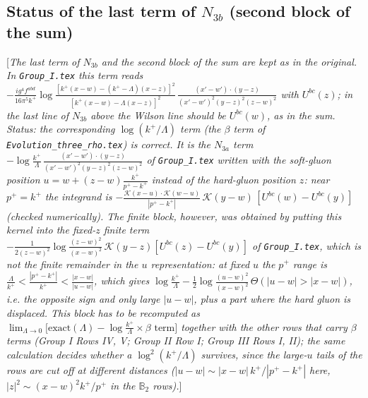 \documentclass[9pt]{article}
\def\mf#1{\mathbb{#1}}
\newcommand{\chg}[1]{{\color{red}#1}}
\newcommand{\rnote}[1]{{\color{teal}[\textit{#1}]}}
\numberwithin{equation}{section}
\begin{document}
\subsection*{\chg{Status of the last term of $N_{3b}$ (second block of the sum)}}
\rnote{The last term of $N_{3b}$ and the second block of the sum are kept as in the original. In \texttt{Group\_I.tex} this term reads $-\frac{ig^{4}f^{abd}}{16\pi^{5}k^{+}}\log\frac{[k^{+}(x-w)-(k^{+}-\Lambda)(x-z)]^{2}}{[k^{+}(x-w)-\Lambda(x-z)]^{2}}\,\frac{(x'-w')\cdot(y-z)}{(x'-w')^{2}(y-z)^{2}(z-w)^{2}}$ with $U^{bc}(z)$; in the last line of $N_{3b}$ above the Wilson line should be $U^{bc}(w)$, as in the sum. Status: the corresponding $\log(k^{+}/\Lambda)$ term (the $\beta$ term of \texttt{Evolution\_three\_rho.tex}) is correct. It is the $N_{3a}$ term $-\log\frac{k^{+}}{\Lambda}\,\frac{(x'-w')\cdot(y-z)}{(x'-w')^{2}(y-z)^{2}(z-w)^{2}}$ of \texttt{Group\_I.tex} written with the soft-gluon position $u=w+(z-w)\frac{k^{+}}{p^{+}-k^{+}}$ instead of the hard-gluon position $z$: near $p^{+}=k^{+}$ the integrand is $-\frac{\mathcal{K}(x-u)\cdot\mathcal{K}(w-u)}{|p^{+}-k^{+}|}\,\mathcal{K}(y-w)\,[U^{bc}(w)-U^{bc}(y)]$ (checked numerically). The finite block, however, was obtained by putting this kernel into the fixed-$z$ finite term $-\frac{1}{2(z-w)^{2}}\log\frac{(z-w)^{2}}{(x-w)^{2}}\,\mathcal{K}(y-z)[U^{bc}(z)-U^{bc}(y)]$ of \texttt{Group\_I.tex}, which is not the finite remainder in the $u$ representation: at fixed $u$ the $p^{+}$ range is $\frac{\Lambda}{k^{+}}<\frac{|p^{+}-k^{+}|}{k^{+}}<\frac{|x-w|}{|u-w|}$, which gives $\log\frac{k^{+}}{\Lambda}-\frac12\log\frac{(u-w)^{2}}{(x-w)^{2}}\,\Theta(|u-w|>|x-w|)$, i.e. the opposite sign and only large $|u-w|$, plus a part where the hard gluon is displaced. This block has to be recomputed as $\lim_{\Lambda\to0}\big[\text{exact}(\Lambda)-\log\frac{k^{+}}{\Lambda}\times\beta\text{ term}\big]$ together with the other rows that carry $\beta$ terms (Group I Rows IV, V; Group II Row I; Group III Rows I, II); the same calculation decides whether a $\log^{2}(k^{+}/\Lambda)$ survives, since the large-$u$ tails of the rows are cut off at different distances ($|u-w|\sim|x-w|\,k^{+}/|p^{+}-k^{+}|$ here, $|z|^{2}\sim(x-w)^{2}k^{+}/p^{+}$ in the $\mf{B}_{2}$ rows).}
\end{document}
